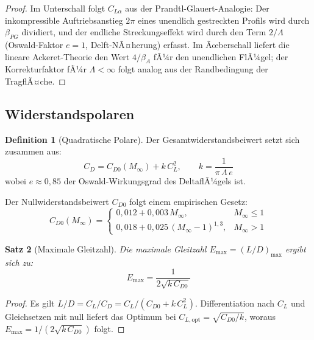 ﻿\documentclass[12pt,a4paper]{article}
\theoremstyle{plain}
\newtheorem{theorem}{Satz}[section]
\theoremstyle{definition}
\newtheorem{definition}[theorem]{Definition}
\theoremstyle{remark}
\begin{document}
\begin{proof}
  Im Unterschall folgt $C_{L\alpha}$ aus der Prandtl-Glauert-Analogie:
  Der inkompressible Auftriebsanstieg $2\pi$ eines unendlich gestreckten Profils
  wird durch $\beta_{PG}$ dividiert, und der endliche Streckungseffekt wird durch
  den Term $2/\Lambda$ (Oswald-Faktor $e=1$, Delft-NÃ¤herung) erfasst.
  Im Ãœberschall liefert die lineare Ackeret-Theorie den Wert $4/\beta_A$ fÃ¼r
  den unendlichen FlÃ¼gel; der Korrekturfaktor fÃ¼r $\Lambda < \infty$ folgt
  analog aus der Randbedingung der TragflÃ¤che.
\end{proof}

\subsection{Widerstandspolaren}

\begin{definition}[Quadratische Polare]
  Der Gesamtwiderstandsbeiwert setzt sich zusammen aus:
  \begin{equation}
    C_D = C_{D0}(M_\infty) + k\,C_L^2, \qquad
    k = \frac{1}{\pi\,\Lambda\,e}
    \label{eq:polar}
  \end{equation}
  wobei $e \approx 0{,}85$ der Oswald-Wirkungsgrad des DeltaflÃ¼gels ist.
\end{definition}

Der Nullwiderstandsbeiwert $C_{D0}$ folgt einem empirischen Gesetz:
\begin{equation}
  C_{D0}(M_\infty) =
  \begin{cases}
    0{,}012 + 0{,}003\,M_\infty, & M_\infty \leq 1 \\
    0{,}018 + 0{,}025\,(M_\infty - 1)^{1{,}3}, & M_\infty > 1
  \end{cases}
  \label{eq:cd0}
\end{equation}

\begin{theorem}[Maximale Gleitzahl]
  Die maximale Gleitzahl $E_{\max} = (L/D)_{\max}$ ergibt sich zu:
  \begin{equation}
    E_{\max} = \frac{1}{2\sqrt{k\,C_{D0}}}
    \label{eq:ldmax}
  \end{equation}
\end{theorem}

\begin{proof}
  Es gilt $L/D = C_L/C_D = C_L / (C_{D0} + k\,C_L^2)$.
  Differentiation nach $C_L$ und Gleichsetzen mit null liefert das Optimum
  bei $C_{L,\text{opt}} = \sqrt{C_{D0}/k}$, woraus $E_{\max} = 1/(2\sqrt{k\,C_{D0}})$
  folgt.
\end{proof}
\end{document}
